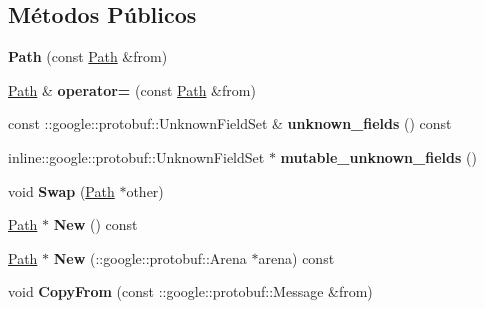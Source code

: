 \subsection*{Métodos Públicos}
\begin{DoxyCompactItemize}
\item 
{\bfseries Path} (const \hyperlink{classvss__debug_1_1Path}{Path} \&from)\hypertarget{classvss__debug_1_1Path_af4b9ca38ed432d20816a9827a72af76f}{}\label{classvss__debug_1_1Path_af4b9ca38ed432d20816a9827a72af76f}

\item 
\hyperlink{classvss__debug_1_1Path}{Path} \& {\bfseries operator=} (const \hyperlink{classvss__debug_1_1Path}{Path} \&from)\hypertarget{classvss__debug_1_1Path_a25616ef08c328c2f4fdcdc422cbcad19}{}\label{classvss__debug_1_1Path_a25616ef08c328c2f4fdcdc422cbcad19}

\item 
const \+::google\+::protobuf\+::\+Unknown\+Field\+Set \& {\bfseries unknown\+\_\+fields} () const \hypertarget{classvss__debug_1_1Path_a23c97dce09667e43b806194d70e6f6fa}{}\label{classvss__debug_1_1Path_a23c97dce09667e43b806194d70e6f6fa}

\item 
inline\+::google\+::protobuf\+::\+Unknown\+Field\+Set $\ast$ {\bfseries mutable\+\_\+unknown\+\_\+fields} ()\hypertarget{classvss__debug_1_1Path_ae7a2a47760d21cac3c3dc030660b1c06}{}\label{classvss__debug_1_1Path_ae7a2a47760d21cac3c3dc030660b1c06}

\item 
void {\bfseries Swap} (\hyperlink{classvss__debug_1_1Path}{Path} $\ast$other)\hypertarget{classvss__debug_1_1Path_aacc84278c4947fc416dcf1a494ef8082}{}\label{classvss__debug_1_1Path_aacc84278c4947fc416dcf1a494ef8082}

\item 
\hyperlink{classvss__debug_1_1Path}{Path} $\ast$ {\bfseries New} () const \hypertarget{classvss__debug_1_1Path_a2ac310685111c0e8cb05019d93763838}{}\label{classvss__debug_1_1Path_a2ac310685111c0e8cb05019d93763838}

\item 
\hyperlink{classvss__debug_1_1Path}{Path} $\ast$ {\bfseries New} (\+::google\+::protobuf\+::\+Arena $\ast$arena) const \hypertarget{classvss__debug_1_1Path_aa25fd596bb4efe2593f0fbbf3d06f49c}{}\label{classvss__debug_1_1Path_aa25fd596bb4efe2593f0fbbf3d06f49c}

\item 
void {\bfseries Copy\+From} (const \+::google\+::protobuf\+::\+Message \&from)\hypertarget{classvss__debug_1_1Path_a66bbe9b4220bba9d28470a33926e86e7}{}\label{classvss__debug_1_1Path_a66bbe9b4220bba9d28470a33926e86e7}


\end{DoxyCompactItemize}
